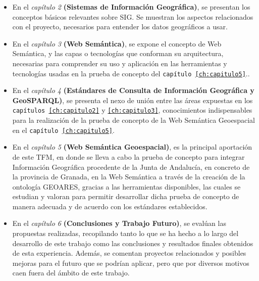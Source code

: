 \begin{itemize}
	\item En el \textit{capítulo 2} \textbf{(Sistemas de Información Geográfica)}, se presentan los conceptos básicos relevantes sobre SIG. Se muestran los aspectos relacionados con el proyecto, necesarios para entender los datos geográficos a usar.
	
	\item En el \textit{capítulo 3} \textbf{(Web Semántica)}, se expone el concepto de Web Semántica, y las capas o tecnologías que conforman su arquitectura, necesarias para comprender su uso y aplicación en las herramientas y tecnologías usadas en la prueba de concepto del \texttt{capítulo \ref{ch:capitulo5}}..
	
	\item En el \textit{capítulo 4} \textbf{(Estándares de Consulta de Información Geográfica y GeoSPARQL)}, se presenta el nexo de unión entre las áreas expuestas en los \texttt{capítulos \ref{ch:capitulo2}} y \texttt{\ref{ch:capitulo3}}, conocimientos indispensables para la realización de la prueba de concepto de la Web Semántica Geoespacial en el \texttt{capítulo \ref{ch:capitulo5}}.
	
	\item En el \textit{capítulo 5} \textbf{(Web Semántica Geoespacial)}, es la principal aportación de este TFM, en donde se lleva a cabo la prueba de concepto para integrar Información Geográfica procedente de la Junta de Andalucía, en concreto de la provincia de Granada, en la Web Semántica a través de la creación de la ontología GEOARES, gracias a las herramientas disponibles, las cuales se estudian y valoran para permitir desarrollar dicha prueba de concepto de manera adecuada y de acuerdo con los estándares establecidos.
	
	

	\item En el \textit{capítulo 6} \textbf{(Conclusiones y Trabajo Futuro)}, se evalúan las propuestas realizadas, recopilando tanto lo que se ha hecho a lo largo del desarrollo de este trabajo como las conclusiones y resultados finales obtenidos de esta experiencia. Además, se comentan proyectos relacionados y posibles mejoras para el futuro que se podrían aplicar, pero que por diversos motivos caen fuera del ámbito de este trabajo.
	

\end{itemize}
